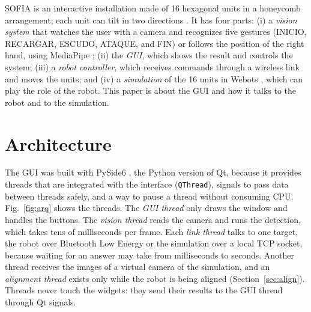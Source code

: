 \documentclass[lettersize,journal]{IEEEtran}
\begin{document}
	SOFIA is an interactive installation made of 16 hexagonal units in a honeycomb arrangement; each unit can tilt in two directions \cite{sofia_architecture}. It has four parts: (i) a \emph{vision system} that watches the user with a camera and recognizes five gestures (INICIO, RECARGAR, ESCUDO, ATAQUE, and FIN) or follows the position of the right hand, using MediaPipe \cite{lugaresi2019mediapipe}; (ii) the \emph{GUI}, which shows the result and controls the system; (iii) a \emph{robot controller}, which receives commands through a wireless link and moves the units; and (iv) a \emph{simulation} of the 16 units in Webots \cite{webots}, which can play the role of the robot. This paper is about the GUI and how it talks to the robot and to the simulation.


	\section{Architecture}

	The GUI was built with PySide6 \cite{pyside6}, the Python version of Qt, because it provides threads that are integrated with the interface (\texttt{QThread}), signals to pass data between threads safely, and a way to pause a thread without consuming CPU. Fig.~\ref{fig:arq} shows the threads. The \emph{GUI thread} only draws the window and handles the buttons. The \emph{vision thread} reads the camera and runs the detection, which takes tens of milliseconds per frame. Each \emph{link thread} talks to one target, the robot over Bluetooth Low Energy \cite{bleak} or the simulation over a local TCP socket, because waiting for an answer may take from milliseconds to seconds. Another thread receives the images of a virtual camera of the simulation, and an \emph{alignment thread} exists only while the robot is being aligned (Section~\ref{sec:align}). Threads never touch the widgets: they send their results to the GUI thread through Qt signals.
\end{document}
